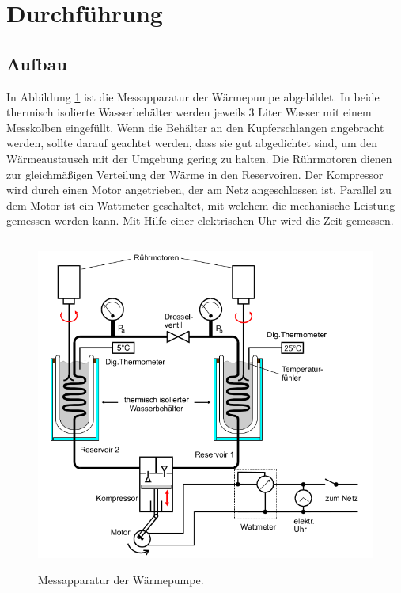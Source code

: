  \section{Durchführung}
\label{sec:Durchführung}

\subsection{Aufbau}

In Abbildung \ref{fig:WaermepumpeAufbau} ist die Messapparatur der
Wärmepumpe abgebildet. In beide thermisch isolierte Wasserbehälter werden
jeweils 3 Liter Wasser mit einem Messkolben eingefüllt. Wenn die Behälter an den
Kupferschlangen angebracht
werden, sollte darauf geachtet werden, dass sie gut abgedichtet sind, um den
Wärmeaustausch mit der Umgebung gering zu halten. Die Rührmotoren dienen zur
gleichmäßigen Verteilung der Wärme in den Reservoiren.
Der Kompressor wird durch einen Motor angetrieben, der am Netz angeschlossen
ist. Parallel zu dem Motor ist ein Wattmeter geschaltet, mit welchem die
mechanische Leistung gemessen werden kann. Mit Hilfe einer elektrischen Uhr
wird die Zeit gemessen.

\newpage

\begin{figure}
  \centering
  \includegraphics[height=11cm]{WaermepumpeAufbau.png}
  \caption{Messapparatur der Wärmepumpe.}
  \label{fig:WaermepumpeAufbau}
\end{figure}

